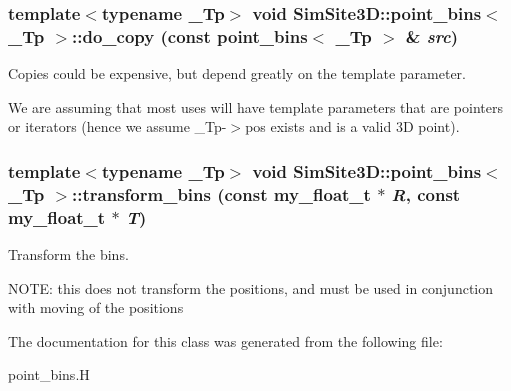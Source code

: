 \subsubsection{\setlength{\rightskip}{0pt plus 5cm}template$<$typename \_\-Tp$>$ void \bf{SimSite3D::point\_\-bins}$<$ \_\-Tp $>$::do\_\-copy (const \bf{point\_\-bins}$<$ \_\-Tp $>$ \& {\em src})\hspace{0.3cm}{\tt  [inline, private]}}\label{classSimSite3D_1_1point__bins_94b59a7f0902763acb6004b2f208418e}


Copies could be expensive, but depend greatly on the template parameter. 

We are assuming that most uses will have template parameters that are pointers or iterators (hence we assume \_\-Tp-$>$pos exists and is a valid 3D point). 
\subsubsection{\setlength{\rightskip}{0pt plus 5cm}template$<$typename \_\-Tp$>$ void \bf{SimSite3D::point\_\-bins}$<$ \_\-Tp $>$::transform\_\-bins (const my\_\-float\_\-t $\ast$ {\em R}, const my\_\-float\_\-t $\ast$ {\em T})\hspace{0.3cm}{\tt  [inline]}}\label{classSimSite3D_1_1point__bins_ae0c63c318c55d37a6abf7f8760f0bd9}


Transform the bins. 

NOTE: this does not transform the positions, and must be used in conjunction with moving of the positions 

The documentation for this class was generated from the following file:\begin{CompactItemize}
\item 
point\_\-bins.H\end{CompactItemize}
